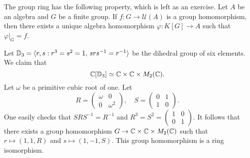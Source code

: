 The group ring has the following property, which is left as an exercise. 
Let $A$ be an algebra and
$G$ be a finite group. If $f\colon G\to\mathcal{U}(A)$ is a group homomorphism, 
then there exists a unique algebra homomorphism $\varphi\colon K[G]\to A$ such that
$\varphi|_G=f$. 

\begin{example}
	Let $\mathbb{D}_3=\langle r,s:r^3=s^2=1,\,srs^{-1}=r^{-1}\rangle$ be the dihedral
	group of six elements. We claim that 
	\[
	\mathbb{C}[\mathbb{D}_3]\simeq\mathbb{C}\times\mathbb{C}\times M_2(\mathbb{C}).
	\]
	Let $\omega$ be a primitive cubic root of one. Let 
	\[
	R=\begin{pmatrix}
		\omega&0\\
		0&\omega^2	
	\end{pmatrix},
	\quad
	S=\begin{pmatrix}
		0&1\\
		1&0
	\end{pmatrix}.
 	\]
 	One easily checks that $SRS^{-1}=R^{-1}$ and $R^3=S^2=\begin{pmatrix}
		1&0\\
		0&1	
	\end{pmatrix}$. It follows that there exists a group homomorphism
	$G\to\mathbb{C}\times\mathbb{C}\times M_2(\mathbb{C})$ such that
	$r\mapsto (1,1,R)$ and $s\mapsto (1,-1,S)$. This group homomorphism
	is a ring isomorphism.  
\end{example}




 